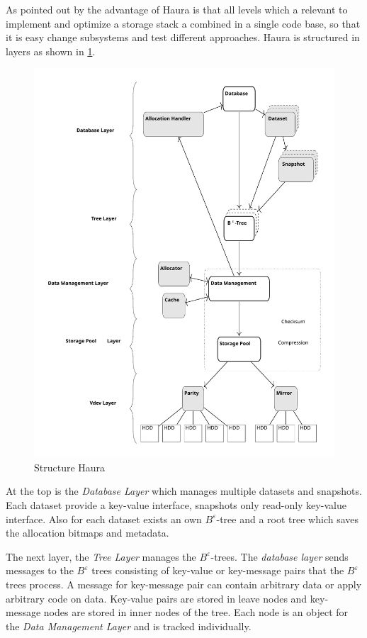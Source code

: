 \documentclass[
	12pt,
	a4paper,
	abstract,
	bibliography=totoc,
	chapterprefix,
	headings=openright,
	numbers=endperiod,
	parskip=half,
	twoside,
]{scrreprt}
\begin{document}
As pointed out by \cite{wunsche2022data} the advantage of Haura is that all levels which a relevant to implement and optimize a storage stack a combined in a single code base, so that it is easy change subsystems and test different approaches.
Haura is structured in layers as shown in \cref{fig:structure Haura}.

\begin{figure}[ht]
	\centering
	\includegraphics[scale=0.4]{overview_haura_level.pdf}
	\caption{Structure Haura \cite{wiedemann2018modern}}
		\label{fig:structure Haura}
\end{figure}


At the top is the \emph{Database Layer} which manages multiple datasets and snapshots. Each dataset provide a key-value interface, snapshots only read-only key-value interface. Also for each dataset exists an own $B^{\varepsilon}$-tree and  a root tree which saves the allocation bitmaps and metadata.

The next layer, the \emph{Tree Layer} manages the $B^{\varepsilon}$-trees.
The \emph{database layer} sends messages to the $B^{\varepsilon}$ trees consisting of key-value or key-message pairs that the $B^{\varepsilon}$ trees process. A message for key-message pair can contain arbitrary data or apply arbitrary code on data.
Key-value pairs are stored in leave nodes and key-message nodes are stored in inner nodes of the tree.
Each node is an object for the \emph{Data Management Layer} and is tracked individually.
\end{document}
